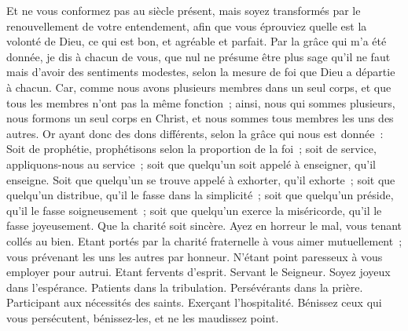 \begin{multicols}{2}
Et ne vous conformez pas au siècle présent, mais soyez transformés par le renouvellement de votre entendement, afin que vous éprouviez quelle est la volonté de Dieu, ce qui est bon, et agréable et parfait.
Par la grâce qui m'a été donnée, je dis à chacun de vous, que nul ne présume être plus sage qu'il ne faut mais d'avoir des sentiments modestes, selon la mesure de foi que Dieu a départie à chacun.
Car, comme nous avons plusieurs membres dans un seul corps, et que tous les membres n'ont pas la même fonction~;
ainsi, nous qui sommes plusieurs, nous formons un seul corps en Christ, et nous sommes tous membres les uns des autres.
Or ayant donc des dons différents, selon la grâce qui nous est donnée~: Soit de prophétie, prophétisons selon la proportion de la foi~;
soit de service, appliquons-nous au service~; soit que quelqu'un soit appelé à enseigner, qu'il enseigne.
Soit que quelqu'un se trouve appelé à exhorter, qu'il exhorte~; soit que quelqu'un distribue, qu'il le fasse dans la simplicité~; soit que quelqu'un préside, qu'il le fasse soigneusement~; soit que quelqu'un exerce la miséricorde, qu'il le fasse joyeusement.
Que la charité soit sincère. Ayez en horreur le mal, vous tenant collés au bien.
Etant portés par la charité fraternelle à vous aimer mutuellement~; vous prévenant les uns les autres par honneur.
N'étant point paresseux à vous employer pour autrui. Etant fervents d'esprit. Servant le Seigneur.
Soyez joyeux dans l'espérance. Patients dans la tribulation. Persévérants dans la prière.
Participant aux nécessités des saints. Exerçant l'hospitalité.
Bénissez ceux qui vous persécutent, bénissez-les, et ne les maudissez point.

\end{multicols}
